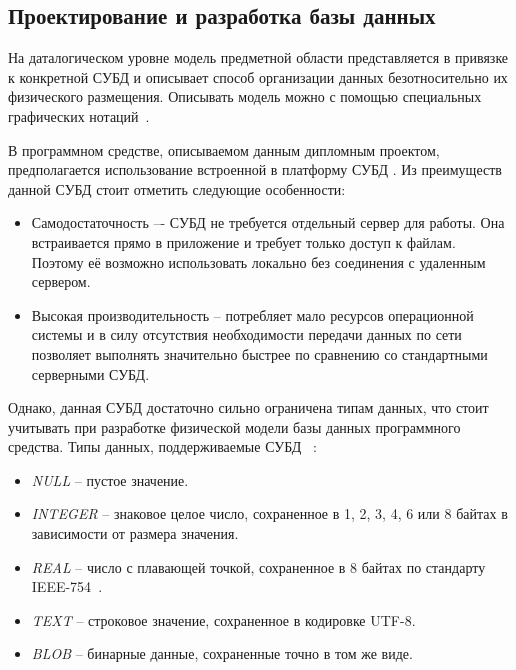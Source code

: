 \subsection{Проектирование и разработка базы данных}
\label{sec:design:database}


На даталогическом уровне модель предметной области представляется в привязке к конкретной СУБД и описывает способ организации данных безотносительно их физического размещения.
Описывать модель можно с помощью специальных графических нотаций~\cite{kulikov_db_workbook}.

В программном средстве, описываемом данным дипломным проектом, предполагается использование встроенной в платформу \andro СУБД \sqlite.
Из преимуществ данной СУБД стоит отметить следующие особенности:
\begin{itemize}
    \item Самодостаточность –- СУБД \sqlite не требуется отдельный сервер для работы.
    Она встраивается прямо в приложение и требует только доступ к файлам.
    Поэтому её возможно использовать локально без соединения с удаленным сервером.
    \item Высокая производительность – \sqlite потребляет мало ресурсов операционной системы и в силу отсутствия необходимости передачи данных по сети позволяет выполнять значительно быстрее по сравнению со стандартными серверными СУБД.
\end{itemize}

Однако, данная СУБД достаточно сильно ограничена типам данных, что стоит учитывать при разработке физической модели базы данных программного средства.
Типы данных, поддерживаемые СУБД \sqlite~\cite{sqlite_types}:
\begin{itemize}
    \item \emph{NULL} -- пустое значение.
    \item \emph{INTEGER} -- знаковое целое число, сохраненное в 1, 2, 3, 4, 6 или 8 байтах в зависимости от размера значения.
    \item \emph{REAL} -- число с плавающей точкой, сохраненное в 8 байтах по стандарту IEEE-754~\cite{ieee_754}.
    \item \emph{TEXT} -- строковое значение, сохраненное в кодировке UTF-8.
    \item \emph{BLOB} -- бинарные данные, сохраненные точно в том же виде.
\end{itemize}

